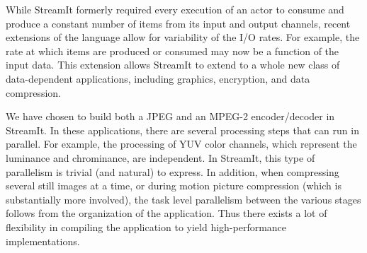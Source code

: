 While StreamIt formerly required every execution of an actor to
consume and produce a constant number of items from its input and
output channels, recent extensions of the language allow for
variability of the I/O rates. For example, the rate at which items are
produced or consumed may now be a function of the input data. This
extension allows StreamIt to extend to a whole new class of
data-dependent applications, including graphics, encryption, and data
compression.

We have chosen to build both a JPEG and an MPEG-2 encoder/decoder in
StreamIt. In these applications, there are several processing steps
that can run in parallel. For example, the processing of YUV color
channels, which represent the luminance and chrominance, are
independent. In StreamIt, this type of parallelism is trivial (and
natural) to express. In addition, when compressing several still
images at a time, or during motion picture compression (which is
substantially more involved), the task level parallelism between the
various stages follows from the organization of the application. Thus
there exists a lot of flexibility in compiling the application to
yield high-performance implementations.
